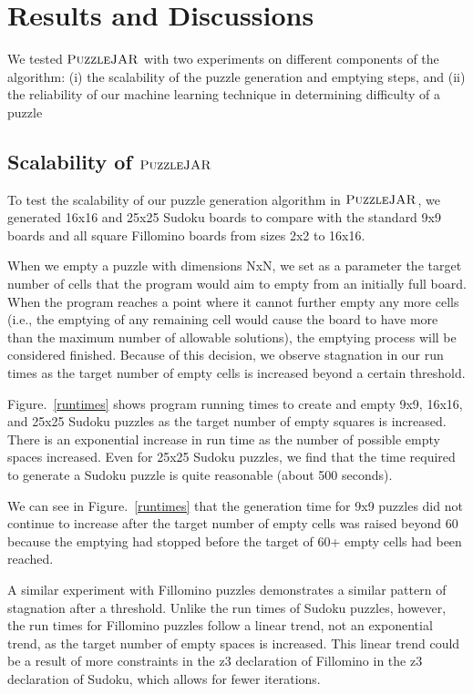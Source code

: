 \section{Results and Discussions}

We tested $\textsc{PuzzleJAR}$ with two experiments on different components of the algorithm: (i) the scalability of the puzzle generation and emptying steps, and (ii) the reliability of our machine learning technique in determining difficulty of a puzzle

\subsection{Scalability of $\textsc{PuzzleJAR}$}

To test the scalability of our puzzle generation algorithm in
$\textsc{PuzzleJAR}$, we generated 16x16 and 25x25 Sudoku boards to compare
with the standard 9x9 boards and all square Fillomino boards from
sizes 2x2 to 16x16.

When we empty a puzzle with dimensions NxN, we set as a parameter the
target number of cells that the program would aim to empty from an
initially full board. When the program reaches a point where it cannot
further empty any more cells (i.e., the emptying of any remaining cell
would cause the board to have more than the maximum number of
allowable solutions), the emptying process will be considered
finished. Because of this decision, we observe stagnation in our run times as
the target number of empty cells is increased beyond a certain
threshold.

Figure.~\ref{runtimes} shows program running times to create and empty 9x9, 16x16, and 25x25 Sudoku puzzles as the target number of empty squares is increased. There is an exponential increase in run time as the number of possible empty spaces increased. Even for 25x25 Sudoku puzzles, we find that the time required to generate a Sudoku puzzle is quite reasonable (about 500 seconds).

We can see in Figure.~\ref{runtimes} that the generation time for 9x9 puzzles did not continue to increase after the target number of empty cells was raised beyond 60 because the emptying had stopped before the target of 60+ empty cells had been reached. 

A similar experiment with Fillomino puzzles demonstrates a similar pattern of stagnation after a threshold. Unlike the run times of Sudoku puzzles, however, the run times for Fillomino puzzles follow a linear trend, not an exponential trend, as the target number of empty spaces is increased. This linear trend could be a result of more constraints in the z3 declaration of Fillomino in the z3 declaration of Sudoku, which allows for fewer iterations.

